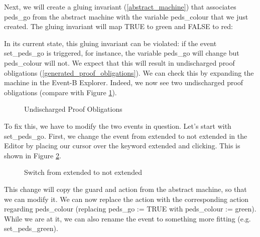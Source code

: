Next, we will create a gluing invariant (\ref{abstract_machine}) that associates \textsf{peds\_go} from the abstract machine with the variable \textsf{peds\_colour} that we just created.  The gluing invariant will map \textsf{TRUE} to \textsf{green} and \textsf{FALSE} to \textsf{red}:


In its current state, this gluing invariant can be violated: if the event \textsf{set\_peds\_go} is triggered, for instance, the variable \textsf{peds\_go} will change but \textsf{peds\_\-colour} will not.  We expect that this will result in undischarged proof obligations (\ref{generated_proof_obligations}).  We can check this by expanding the machine in the Event-B Explorer.  Indeed, we now see two undischarged proof obligations (compare with Figure \ref{fig_tut_07_undischarged}).

\begin{figure}[!ht]
\begin{center}
	\caption{Undischarged Proof Obligations}
	\label{fig_tut_07_undischarged}
\end{center}
\end{figure}

To fix this, we have to modify the two events in question.  Let's start with \textsf{set\_peds\_go}.  First, we change the event from extended to not extended in the Editor by placing our cursor over the keyword \textsf{extended} and clicking. This is shown in Figure \ref{fig_tut_07_event_refinement}.

\begin{figure}[!ht]
\begin{center}
	\caption{Switch from extended to not extended}
	\label{fig_tut_07_event_refinement}
\end{center}
\end{figure}

This change will copy the guard and action from the abstract machine, so that we can modify it.  We can now replace the action with the corresponding action regarding \textsf{peds\_colour} (replacing \textsf{peds\_go := TRUE} with \textsf{peds\_colour := green}).  While we are at it, we can also rename the event to something more fitting (e.g. \textsf{set\_peds\_green}).

